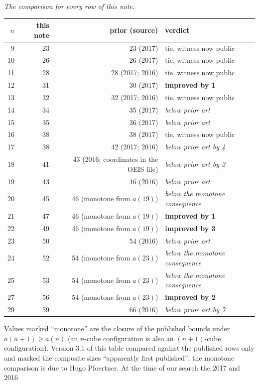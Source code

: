 \documentclass[11pt,a4paper]{article}
\begin{document}
\emph{The comparison for every row of this note.}
\begin{center}
\begin{tabular}{rrrl}
\toprule
$n$ & this note & prior (source) & verdict\\
\midrule
 9 & 23 & 23 (2017) & tie, witness now public\\
10 & 26 & 26 (2017) & tie, witness now public\\
11 & 28 & 28 (2017; 2016) & tie, witness now public\\
12 & 31 & 30 (2017) & \textbf{improved by 1}\\
13 & 32 & 32 (2017; 2016) & tie, witness now public\\
14 & 34 & 35 (2017) & \emph{below prior art}\\
15 & 35 & 36 (2017) & \emph{below prior art}\\
16 & 38 & 38 (2017) & tie, witness now public\\
17 & 38 & 42 (2017; 2016) & \emph{below prior art by 4}\\
18 & 41 & 43 (2016; coordinates in the OEIS file) & \emph{below prior art by 2}\\
19 & 43 & 46 (2016) & \emph{below prior art}\\
20 & 45 & 46 (monotone from $a(19)$) & \emph{below the monotone consequence}\\
21 & 47 & 46 (monotone from $a(19)$) & \textbf{improved by 1}\\
22 & 49 & 46 (monotone from $a(19)$) & \textbf{improved by 3}\\
23 & 50 & 54 (2016) & \emph{below prior art}\\
24 & 52 & 54 (monotone from $a(23)$) & \emph{below the monotone consequence}\\
25 & 53 & 54 (monotone from $a(23)$) & \emph{below the monotone consequence}\\
27 & 56 & 54 (monotone from $a(23)$) & \textbf{improved by 2}\\
29 & 59 & 66 (2016) & \emph{below prior art by 7}\\
\bottomrule
\end{tabular}
\end{center}
Values marked ``monotone'' are the closure of the published bounds under $a(n+1)\ge a(n)$
(an $n$-cube configuration is also an $(n+1)$-cube configuration).  Version 3.1 of this table
compared against the published rows only and marked the composite sizes ``apparently first
published''; the monotone comparison is due to Hugo Pfoertner.  At the time of our search the 2017 and 2016
\end{document}
